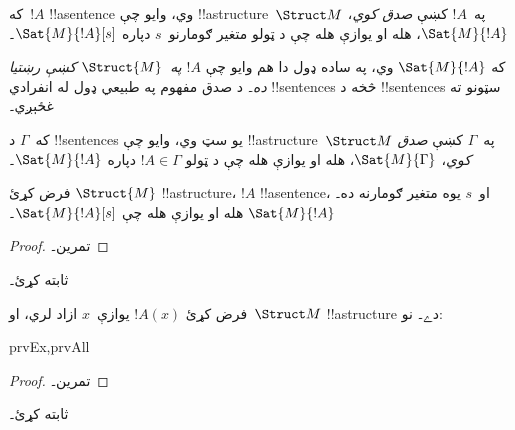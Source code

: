 \documentclass[../../../include/open-logic-section]{subfiles}
\begin{document}
\begin{defn}
که~$!A$ !!a{sentence} وي، وايو چې !!a{structure}~$\Struct M$
په~$!A$ کښې \emph{صدق کوي}، $\Sat{M}{!A}$، هله او يوازې هله چې د
ټولو متغير ګومارنو~$s$ دپاره $\Sat{M}{!A}[s]$۔
\end{defn}

که $\Sat{M}{!A}$ وي، په ساده ډول دا هم وايو چې \emph{$!A$
په~$\Struct{M}$ کښې رښتيا ده۔} د صدق مفهوم په طبيعي ډول له انفرادي
!!{sentence}s څخه د !!{sentence}s سټونو ته غځېږي۔

\begin{defn}
که~$\Gamma$ د !!{sentence}s يو سټ وي، وايو چې
!!a{structure}~$\Struct M$ په~$\Gamma$ کښې \emph{صدق کوي}،
$\Sat{M}{\Gamma}$، هله او يوازې هله چې د ټولو
$!A \in \Gamma$ دپاره $\Sat{M}{!A}$۔
\end{defn}

\begin{prop}
  فرض کړئ $\Struct{M}$ !!a{structure}، $!A$ !!a{sentence}، او~$s$
  يوه متغير ګومارنه ده۔ $\Sat{M}{!A}$ هله او يوازې هله چې
  $\Sat{M}{!A}[s]$۔
\end{prop}

\begin{proof}
تمرین۔
\end{proof}

\begin{prob}
 ثابته کړئ۔
\end{prob}

\begin{prop}
  فرض کړئ $!A(x)$ يوازې~$x$ ازاد لري، او~$\Struct M$
  !!a{structure} دے۔ نو:
  \begin{tagenumerate}{prvEx,prvAll}
\end{tagenumerate}
\end{prop}

\begin{proof}
تمرین۔
\end{proof}

\begin{prob}
 ثابته کړئ۔
\end{prob}
\end{document}

